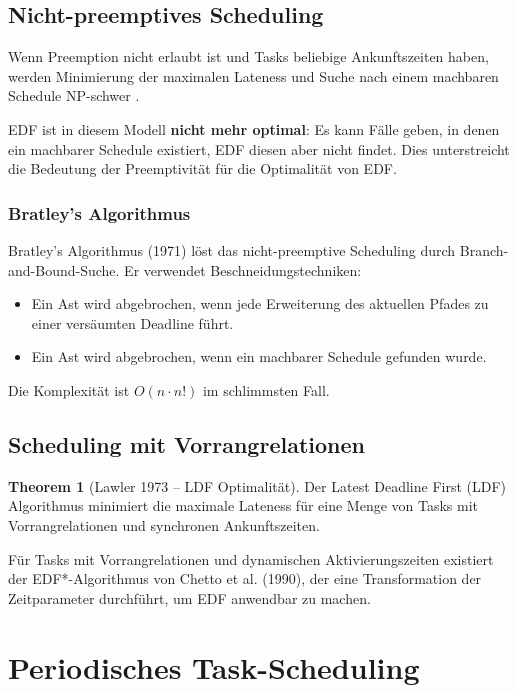 ﻿\documentclass[a4paper,12pt]{report}
\theoremstyle{definition}
\newtheorem{theorem}{Theorem}[chapter]
\begin{document}
\section{Nicht-preemptives Scheduling}

Wenn Preemption nicht erlaubt ist und Tasks beliebige Ankunftszeiten haben,
werden Minimierung der maximalen Lateness und Suche nach einem machbaren Schedule
NP-schwer \cite{Buttazzo2011}.

EDF ist in diesem Modell \textbf{nicht mehr optimal}: Es kann Fälle geben, in
denen ein machbarer Schedule existiert, EDF diesen aber nicht findet. Dies
unterstreicht die Bedeutung der Preemptivität für die Optimalität von EDF.

\subsection{Bratley's Algorithmus}

Bratley's Algorithmus (1971) löst das nicht-preemptive Scheduling durch
Branch-and-Bound-Suche. Er verwendet Beschneidungstechniken:
\begin{itemize}
	\item Ein Ast wird abgebrochen, wenn jede Erweiterung des aktuellen Pfades
	      zu einer versäumten Deadline führt.
	\item Ein Ast wird abgebrochen, wenn ein machbarer Schedule gefunden wurde.
\end{itemize}
Die Komplexität ist $O(n \cdot n!)$ im schlimmsten Fall.

\section{Scheduling mit Vorrangrelationen}

\begin{theorem}[Lawler 1973 -- LDF Optimalität]
	Der Latest Deadline First (LDF) Algorithmus minimiert die maximale Lateness
	für eine Menge von Tasks mit Vorrangrelationen und synchronen Ankunftszeiten.
\end{theorem}

Für Tasks mit Vorrangrelationen und dynamischen Aktivierungszeiten existiert der
EDF*-Algorithmus von Chetto et al. (1990), der eine Transformation der
Zeitparameter durchführt, um EDF anwendbar zu machen.

\chapter{Periodisches Task-Scheduling}
\label{chap:periodisch}
\end{document}
